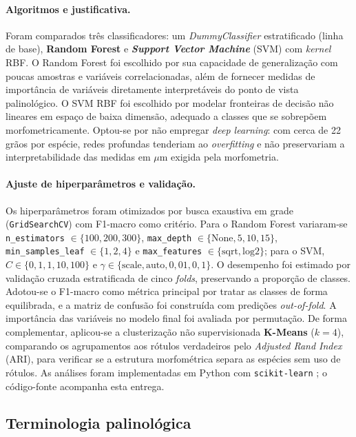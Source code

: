 \documentclass[pdflatex,sn-mathphys-num]{sn-jnl}
\begin{document}
\paragraph{Algoritmos e justificativa.} Foram comparados três classificadores: um \textit{DummyClassifier} estratificado (linha de base), \textbf{Random Forest} e \textbf{\textit{Support Vector Machine}} (SVM) com \textit{kernel} RBF. O Random Forest foi escolhido por sua  capacidade de generalização com poucas amostras e variáveis correlacionadas, além de fornecer medidas de importância de variáveis diretamente interpretáveis do ponto de vista palinológico. O SVM RBF foi escolhido por modelar fronteiras de decisão não lineares em espaço de baixa dimensão, adequado a classes que se sobrepõem morfometricamente. Optou-se por não empregar \textit{deep learning}: com cerca de 22 grãos por espécie, redes profundas tenderiam ao \textit{overfitting} e não preservariam a interpretabilidade das medidas em $\mu$m exigida pela morfometria.

\paragraph{Ajuste de hiperparâmetros e validação.} Os hiperparâmetros foram otimizados por busca exaustiva em grade (\texttt{GridSearchCV}) com F1-macro como critério. Para o Random Forest variaram-se \texttt{n\_estimators} $\in \{100, 200, 300\}$, \texttt{max\_depth} $\in \{\text{None}, 5, 10, 15\}$, \texttt{min\_samples\_leaf} $\in \{1, 2, 4\}$ e \texttt{max\_features} $\in \{\text{sqrt}, \text{log2}\}$; para o SVM, $C \in \{0{,}1, 1, 10, 100\}$ e $\gamma \in \{\text{scale}, \text{auto}, 0{,}01, 0{,}1\}$. O desempenho foi estimado por validação cruzada estratificada de cinco \textit{folds}, preservando a proporção de classes. Adotou-se o F1-macro como métrica principal por tratar as classes de forma equilibrada, e a matriz de confusão foi construída com predições \textit{out-of-fold}. A importância das variáveis no modelo final foi avaliada por permutação. De forma complementar, aplicou-se a clusterização não supervisionada \textbf{K-Means} ($k=4$), comparando os agrupamentos aos rótulos verdadeiros pelo \textit{Adjusted Rand Index} (ARI), para verificar se a estrutura morfométrica separa as espécies sem uso de rótulos. As análises foram implementadas em Python com \texttt{scikit-learn} \cite{pedregosa2011}; o código-fonte acompanha esta entrega.

\subsection{Terminologia palinológica}\label{subsec:terminologia}
\end{document}

